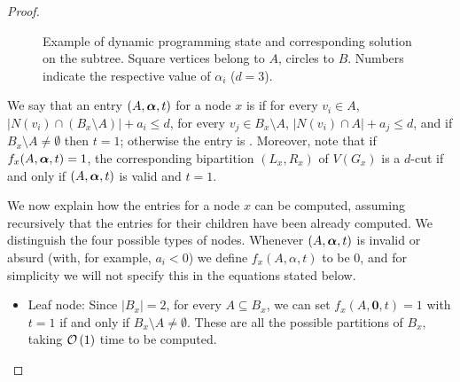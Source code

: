 \begin{proof}
\begin{figure}[!htb]
\begin{tikzpicture}[rotate = 90]
        \end{tikzpicture}
        \caption{Example of dynamic programming state and corresponding solution on the subtree. Square vertices belong to $A$, circles to $B$. Numbers indicate the respective value of $\alpha_i$ ($d=3$).\label{fig:treewidth}}
    \end{figure}

    We say that an entry $(A, \balpha, t)$ for a node $x$ is  if for every $v_i \in A$, $|N(v_i) \cap (B_x \setminus A)| + a_i \leq d$, for every $v_j \in B_x \setminus A$, $|N(v_i) \cap A| + a_j \leq d$, and if $B_x \setminus A \neq \emptyset$ then $t = 1$; otherwise the entry is . Moreover, note that if $f_x(A, \balpha, t)=1$, the corresponding bipartition $(L_x,R_x)$ of $V(G_x)$ is a $d$-cut if and only if $(A, \balpha, t)$ is valid and $t = 1$.


    We now explain how the entries for a node $x$ can be computed, assuming recursively that the entries for their children have been already computed. We distinguish the four possible types of nodes. Whenever $(A, \balpha, t)$ is invalid or absurd (with, for example, $a_i < 0$) we define $f_x(A, \alpha, t)$ to be $0$, and for simplicity we will not specify this in the equations stated below.

    \begin{itemize}
        \item Leaf node: Since $|B_x| = 2$, for every $A \subseteq B_x$, we can set $f_x(A, \boldsymbol{0}, t) = 1$ with $t = 1$ if and only if $B_x \setminus A \neq \emptyset$.
        These are all the possible partitions of $B_x$, taking $\bigO{1}$ time to be computed.


\end{itemize}
\end{proof}
